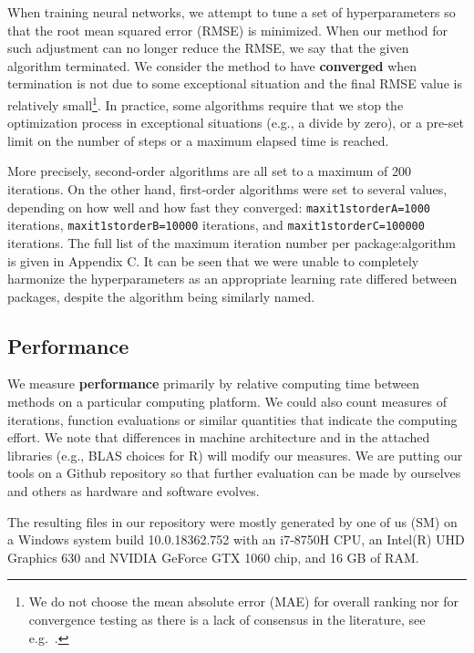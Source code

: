 When training neural networks, we attempt to tune a set of
hyperparameters so that the root mean squared error (RMSE) is minimized.
When our method for such adjustment can no longer reduce the RMSE, we
say that the given algorithm terminated. We consider the method to have
\textbf{converged} when termination is not due to some exceptional
situation and the final RMSE value is relatively small\footnote{We do
  not choose the mean absolute error (MAE) for overall ranking nor for
  convergence testing as there is a lack of consensus in the literature,
  see e.g.~\citep{willmott2005advantages,chai2014root}.}. In practice,
some algorithms require that we stop the optimization process in
exceptional situations (e.g., a divide by zero), or a pre-set limit on
the number of steps or a maximum elapsed time is reached.

More precisely, second-order algorithms are all set to a maximum of 200
iterations. On the other hand, first-order algorithms were set to
several values, depending on how well and how fast they converged:
\texttt{maxit1storderA=1000} iterations, \texttt{maxit1storderB=10000}
iterations, and \texttt{maxit1storderC=100000} iterations. The full list
of the maximum iteration number per package:algorithm is given in
Appendix C. It can be seen that we were unable to completely harmonize
the hyperparameters as an appropriate learning rate differed between
packages, despite the algorithm being similarly named.

\hypertarget{performance}{%
\subsection{Performance}\label{performance}}

We measure \textbf{performance} primarily by relative computing time
between methods on a particular computing platform. We could also count
measures of iterations, function evaluations or similar quantities that
indicate the computing effort. We note that differences in machine
architecture and in the attached libraries (e.g., BLAS choices for R)
will modify our measures. We are putting our tools on a Github
repository so that further evaluation can be made by ourselves and
others as hardware and software evolves.

The resulting files in our repository were mostly generated by one of us
(SM) on a Windows system build 10.0.18362.752 with an i7-8750H CPU, an
Intel(R) UHD Graphics 630 and NVIDIA GeForce GTX 1060 chip, and 16 GB of
RAM.


